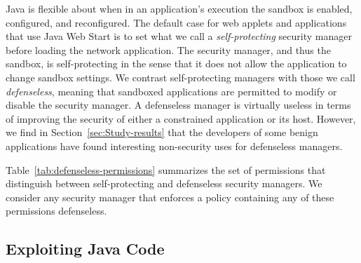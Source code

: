 \documentclass{sig-alternate}
\begin{document}
Java is flexible about when in an application's execution the sandbox
is enabled, configured, and reconfigured. The default case for web applets and applications
that use Java Web Start is to set what we call a \textit{self-protecting} security
manager before loading the network application. The security
manager, and thus the sandbox, is self-protecting in the sense that
it does not allow the application to change sandbox settings. We contrast
self-protecting managers with those we call 
\textit{defenseless}, meaning that sandboxed applications are 
permitted to modify or disable the security manager.  
A defenseless manager is virtually useless in terms of improving the
security of either a constrained application or its host. However, we find
in Section~\ref{sec:Study-results} that the developers of some benign applications
have found interesting non-security uses for defenseless managers. 

Table~\ref{tab:defenseless-permissions} summarizes the set of permissions
that distinguish between self-protecting and defenseless security
managers. We consider any security manager that enforces a policy
containing any of these permissions defenseless.

\subsection{Exploiting Java Code}
\label{sec:javaexploits}
\end{document}
